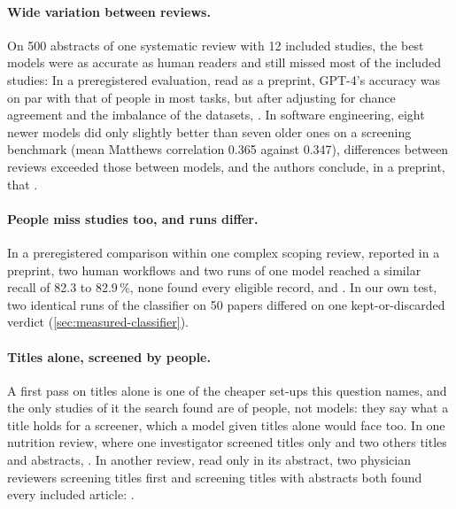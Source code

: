 \paragraph{Wide variation between reviews.}
On 500 abstracts of one systematic review with 12 included studies, the
best models were as accurate as human readers and still missed most of
the included studies:
In a preregistered evaluation, read as a preprint, GPT-4's accuracy was
on par with that of people in most tasks, but after adjusting for chance
agreement and the imbalance of the datasets,
.
In software engineering, eight newer models did only slightly better than
seven older ones on a screening benchmark (mean Matthews correlation
0.365 against 0.347), differences between reviews exceeded those between
models, and the authors conclude, in a preprint, that
.

\paragraph{People miss studies too, and runs differ.}
In a preregistered comparison within one complex scoping review, reported
in a preprint, two human workflows and two runs of one model reached a
similar recall of 82.3 to 82.9\,\%, none found every eligible record, and
.
In our own test, two identical runs of the classifier on 50 papers
differed on one kept-or-discarded verdict (\cref{sec:measured-classifier}).

\paragraph{Titles alone, screened by people.}
A first pass on titles alone is one of the cheaper set-ups this question
names, and the only studies of it the search found are of people, not
models: they say what a title holds for a screener, which a model given
titles alone would face too.
In one nutrition review, where one investigator screened titles only and
two others titles and abstracts, .
In another review, read only in its abstract, two physician reviewers
screening titles first and screening titles with abstracts both found
every included article:
.

